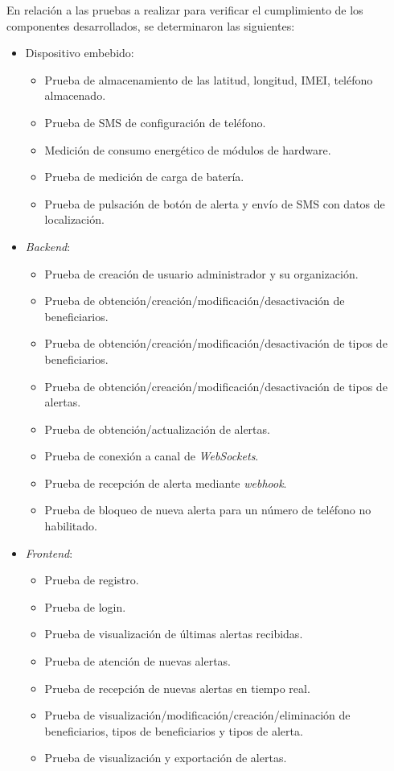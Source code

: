 En relación a las pruebas a realizar para verificar el cumplimiento de los componentes desarrollados, se determinaron las siguientes:

\begin{itemize}
\item Dispositivo embebido:
	\begin{itemize}
	\item Prueba de almacenamiento de las latitud, longitud, IMEI, teléfono almacenado.
	\item Prueba de SMS de configuración de teléfono.
	\item Medición de consumo energético de módulos de hardware.
	\item Prueba de medición de carga de batería.
	\item Prueba de pulsación de botón de alerta y envío de SMS con datos de localización.
	\end{itemize}
\item \textit{Backend}:
	\begin{itemize}
	\item Prueba de creación de usuario administrador y su organización.
	\item Prueba de obtención/creación/modificación/desactivación de beneficiarios.
	\item Prueba de obtención/creación/modificación/desactivación de tipos de beneficiarios.
	\item Prueba de obtención/creación/modificación/desactivación de tipos de alertas.
	\item Prueba de obtención/actualización de alertas.
	\item Prueba de conexión a canal de \textit{WebSockets}.
	\item Prueba de recepción de alerta mediante \textit{webhook}.
	\item Prueba de bloqueo de nueva alerta para un número de teléfono no habilitado.
	\end{itemize}
\item \textit{Frontend}:
	\begin{itemize}
	\item Prueba de registro.
	\item Prueba de login.
	\item Prueba de visualización de últimas alertas recibidas.
	\item Prueba de atención de nuevas alertas.
	\item Prueba de recepción de nuevas alertas en tiempo real.
	\item Prueba de visualización/modificación/creación/eliminación de beneficiarios, tipos de beneficiarios y tipos de alerta.
	\item Prueba de visualización y exportación de alertas.
	\end{itemize}

\end{itemize}


